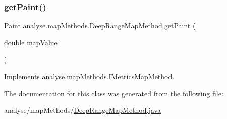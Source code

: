 \subsubsection{\texorpdfstring{get\+Paint()}{getPaint()}}
{\footnotesize\ttfamily Paint analyse.\+map\+Methods.\+Deep\+Range\+Map\+Method.\+get\+Paint (\begin{DoxyParamCaption}\item[{double}]{map\+Value }\end{DoxyParamCaption})\hspace{0.3cm}{\ttfamily [inline]}}



Implements \mbox{\hyperlink{interfaceanalyse_1_1map_methods_1_1_i_metrics_map_method_a102909023c32cebe3bc75052f55b24a0}{analyse.\+map\+Methods.\+I\+Metrics\+Map\+Method}}.



The documentation for this class was generated from the following file\+:\begin{DoxyCompactItemize}
\item 
analyse/map\+Methods/\mbox{\hyperlink{_deep_range_map_method_8java}{Deep\+Range\+Map\+Method.\+java}}\end{DoxyCompactItemize}
